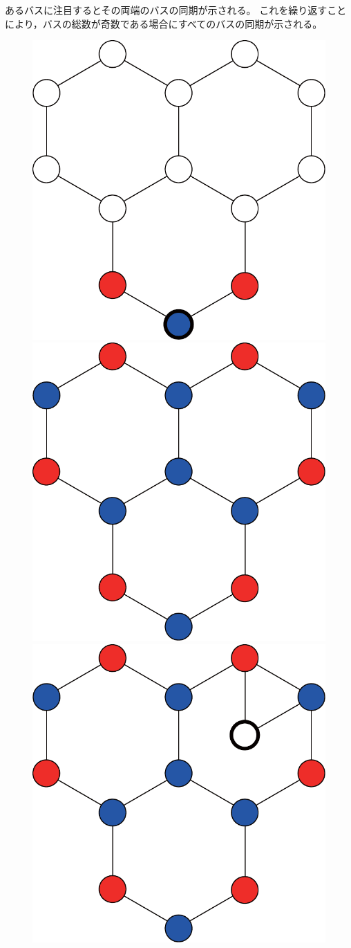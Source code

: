 \documentclass[tombow,dvipdfmx]{corona-a5}
\begin{document}
\begin{証明}
あるバスに注目するとその両端のバスの同期が示される。
これを繰り返すことにより，バスの総数が奇数である場合にすべてのバスの同期が示される。
\end{証明}

\begin{figure}[t]
  \centering
  {
  \begin{minipage}{0.3\linewidth}
    \centering
    \includegraphics[width = .60\linewidth]{figs/honya}
    \subcaption{  }
  \end{minipage}
  \begin{minipage}{0.3\linewidth}
    \centering
    \includegraphics[width = .60\linewidth]{figs/honyb}
    \subcaption{  }
  \end{minipage}
  \begin{minipage}{0.3\linewidth}
    \centering
    \includegraphics[width = .60\linewidth]{figs/honyc}

\end{minipage}}
\end{figure}
\end{document}
